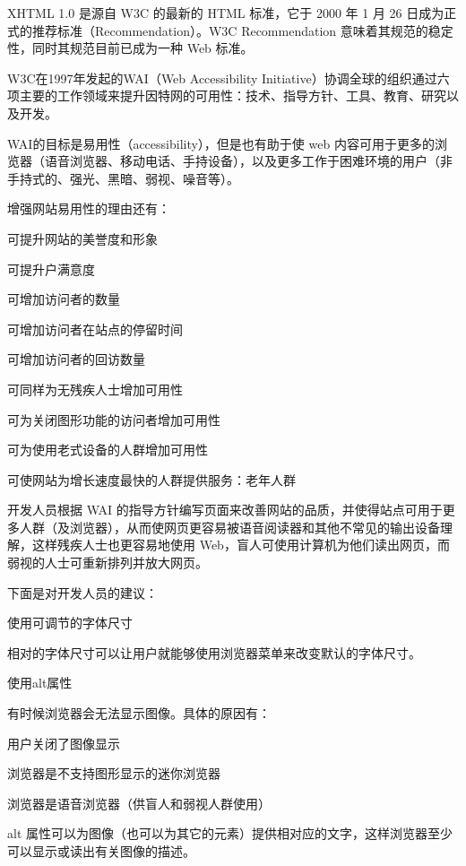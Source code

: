 XHTML 1.0 是源自 W3C 的最新的 HTML 标准，它于 2000 年 1 月 26 日成为正式的推荐标准（Recommendation）。W3C Recommendation 意味着其规范的稳定性，同时其规范目前已成为一种 Web 标准。

W3C在1997年发起的WAI（Web Accessibility Initiative）协调全球的组织通过六项主要的工作领域来提升因特网的可用性：技术、指导方针、工具、教育、研究以及开发。

WAI的目标是易用性（accessibility），但是也有助于使 web 内容可用于更多的浏览器（语音浏览器、移动电话、手持设备），以及更多工作于困难环境的用户（非手持式的、强光、黑暗、弱视、噪音等）。

增强网站易用性的理由还有：

\begin{compactitem}
\item 可提升网站的美誉度和形象
\item 可提升户满意度
\item 可增加访问者的数量
\item 可增加访问者在站点的停留时间
\item 可增加访问者的回访数量
\item 可同样为无残疾人士增加可用性
\item 可为关闭图形功能的访问者增加可用性
\item 可为使用老式设备的人群增加可用性
\item 可使网站为增长速度最快的人群提供服务：老年人群
\end{compactitem}



开发人员根据 WAI 的指导方针编写页面来改善网站的品质，并使得站点可用于更多人群（及浏览器），从而使网页更容易被语音阅读器和其他不常见的输出设备理解，这样残疾人士也更容易地使用 Web，盲人可使用计算机为他们读出网页，而弱视的人士可重新排列并放大网页。

下面是对开发人员的建议：

\begin{compactenum}
\item 使用可调节的字体尺寸

相对的字体尺寸可以让用户就能够使用浏览器菜单来改变默认的字体尺寸。

\item 使用alt属性

有时候浏览器会无法显示图像。具体的原因有：
	\begin{compactitem}
	\item 用户关闭了图像显示
	\item 浏览器是不支持图形显示的迷你浏览器
	\item 浏览器是语音浏览器（供盲人和弱视人群使用）
	\end{compactitem}

alt 属性可以为图像（也可以为其它的元素）提供相对应的文字，这样浏览器至少可以显示或读出有关图像的描述。


\end{compactenum}

